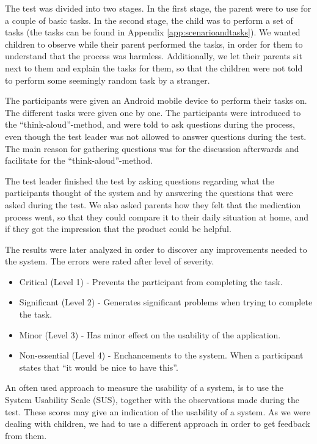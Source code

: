 The test was divided into two stages. In the first stage, the parent were to use \app{} for a couple of basic tasks. In the second stage, the child was to perform a set of tasks (the tasks can be found in Appendix \ref{app:scenarioandtasks}). We wanted children to observe while their parent performed the tasks, in order for them to understand that the process was harmless. Additionally, we let their parents sit next to them and explain the tasks for them, so that the children were not told to perform some seemingly random task by a stranger.    
 
The participants were given an Android mobile device to perform their tasks on. The different tasks were given one by one. The participants were introduced to the ``think-aloud''-method\cite{lewis1982using}, and were told to ask questions during the process, even though the test leader was not allowed to answer questions during the test. The main reason for gathering questions was for the discussion afterwards and facilitate for the ``think-aloud''-method. 

The test leader finished the test by asking questions regarding what the participants thought of the system and by answering the questions that were asked during the test. We also asked parents how they felt that the medication process went, so that they could compare it to their daily situation at home, and if they got the impression that the product could be helpful.  

The results were later analyzed in order to discover any improvements needed to the system. The errors were rated after level of severity\cite{dumas1995practical}. 

\begin{itemize}
\item{Critical (Level 1) - Prevents the participant from completing the task.}
\item{Significant (Level 2) - Generates significant problems when trying to complete the task.}
\item{Minor (Level 3) - Has minor effect on the usability of the application.}
\item{Non-essential (Level 4) - Enchancements to the system. When a participant states that ``it would be nice to have this''.}
\end{itemize}


An often used approach to measure the usability of a system, is to use the System Usability Scale (SUS)\cite{sus}, together with the observations made during the test. These scores may give an indication of the usability of a system\cite{susform}. As we were dealing with children, we had to use a different approach in order to get feedback from them. 

